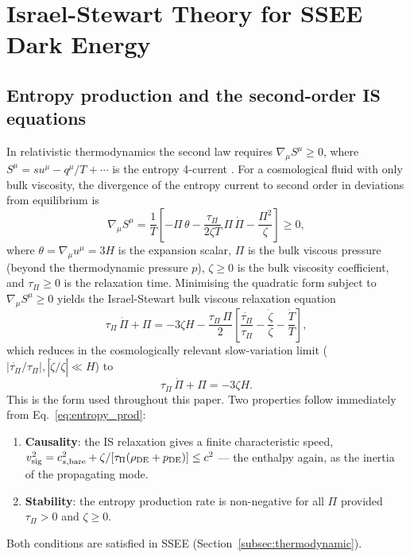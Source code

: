 \documentclass[12pt,a4paper]{article}
\newcommand{\tauPi}{\tau_\Pi}
\begin{document}
\section{Israel-Stewart Theory for SSEE Dark Energy}
\label{sec:theory}

\subsection{Entropy production and the second-order IS equations}
\label{subsec:entropy}

In relativistic thermodynamics the second law requires
$\nabla_\mu S^\mu \geq 0$, where $S^\mu = su^\mu - q^\mu/T + \cdots$
is the entropy 4-current \citep{Weinberg1971,Israel1976,IsraelStewart1979}.
For a cosmological fluid with only bulk viscosity, the divergence of the entropy
current to second order in deviations from equilibrium is
\begin{equation}
  \nabla_\mu S^\mu = \frac{1}{T}\!\left[-\Pi\,\theta
    - \frac{\tauPi}{2\zeta T}\,\Pi\,\dot{\Pi}
    - \frac{\Pi^2}{\zeta}\right] \geq 0,
  \label{eq:entropy_prod}
\end{equation}
where $\theta = \nabla_\mu u^\mu = 3H$ is the expansion scalar,
$\Pi$ is the bulk viscous pressure (beyond the thermodynamic pressure $p$),
$\zeta \geq 0$ is the bulk viscosity coefficient, and
$\tauPi \geq 0$ is the relaxation time.
Minimising the quadratic form subject to $\nabla_\mu S^\mu \geq 0$ yields the
Israel-Stewart bulk viscous relaxation equation
\begin{equation}
  \tauPi\,\dot{\Pi} + \Pi = -3\zeta H
    - \frac{\tauPi\,\Pi}{2}\left[\frac{\dot{\tauPi}}{\tauPi}
    - \frac{\dot{\zeta}}{\zeta} - \frac{\dot{T}}{T}\right],
  \label{eq:IS_full}
\end{equation}
which reduces in the cosmologically relevant slow-variation limit
($|\dot{\tauPi}/\tauPi|, |\dot{\zeta}/\zeta| \ll H$) to
\begin{equation}
  \boxed{\tauPi\,\dot{\Pi} + \Pi = -3\zeta H.}
  \label{eq:IS_simple}
\end{equation}
This is the form used throughout this paper.
Two properties follow immediately from Eq.~\eqref{eq:entropy_prod}:
\begin{enumerate}
  \item \textbf{Causality}: the IS relaxation gives a finite characteristic speed,
    $v^2_{\rm sig} = c^2_{s,\rm bare} + \zeta/[\tauPi(\rho_{\mathrm{DE}}+p_{\mathrm{DE}})] \leq c^2$
    \citep{HiscockLindblom1983} --- the enthalpy again, as the inertia of the
    propagating mode.
  \item \textbf{Stability}: the entropy production rate is non-negative for all
    $\Pi$ provided $\tauPi > 0$ and $\zeta \geq 0$.
\end{enumerate}
Both conditions are satisfied in SSEE (Section~\ref{subsec:thermodynamic}).
\end{document}
